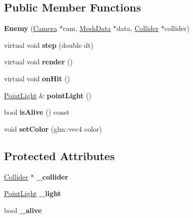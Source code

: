 \subsection*{Public Member Functions}
\begin{DoxyCompactItemize}
\item 
\hypertarget{class_enemy_a510bb7f4bb1a38fefaef246c458e672a}{}{\bfseries Enemy} (\hyperlink{class_camera}{Camera} $\ast$cam, \hyperlink{class_mesh_data}{Mesh\+Data} $\ast$data, \hyperlink{class_collider}{Collider} $\ast$collider)\label{class_enemy_a510bb7f4bb1a38fefaef246c458e672a}

\item 
\hypertarget{class_enemy_ae741a4a1ba7097e42b6764923e82b8fc}{}virtual void {\bfseries step} (double dt)\label{class_enemy_ae741a4a1ba7097e42b6764923e82b8fc}

\item 
\hypertarget{class_enemy_a62875c8aba22d278c89caa87af6c7b69}{}virtual void {\bfseries render} ()\label{class_enemy_a62875c8aba22d278c89caa87af6c7b69}

\item 
\hypertarget{class_enemy_a116b78399fc93edf91ae2b20cb278a26}{}virtual void {\bfseries on\+Hit} ()\label{class_enemy_a116b78399fc93edf91ae2b20cb278a26}

\item 
\hypertarget{class_enemy_a2faed0e6daf8ca132f40c33e7b192a07}{}\hyperlink{class_point_light}{Point\+Light} \& {\bfseries point\+Light} ()\label{class_enemy_a2faed0e6daf8ca132f40c33e7b192a07}

\item 
\hypertarget{class_enemy_a0f2ab608b481d1f19f65e83f98eda591}{}bool {\bfseries is\+Alive} () const \label{class_enemy_a0f2ab608b481d1f19f65e83f98eda591}

\item 
\hypertarget{class_enemy_a01f4404cf0c0c38bb287241541c2cef1}{}void {\bfseries set\+Color} (glm\+::vec4 color)\label{class_enemy_a01f4404cf0c0c38bb287241541c2cef1}

\end{DoxyCompactItemize}
\subsection*{Protected Attributes}
\begin{DoxyCompactItemize}
\item 
\hypertarget{class_enemy_ab90b6580f551c2d344dcdd9848d3da0a}{}\hyperlink{class_collider}{Collider} $\ast$ {\bfseries \+\_\+collider}\label{class_enemy_ab90b6580f551c2d344dcdd9848d3da0a}

\item 
\hypertarget{class_enemy_a7bb871e6546c740a456613873f472e69}{}\hyperlink{class_point_light}{Point\+Light} {\bfseries \+\_\+light}\label{class_enemy_a7bb871e6546c740a456613873f472e69}

\item 
\hypertarget{class_enemy_acf28445e8f8aabedcc8cd248ca1b9588}{}bool {\bfseries \+\_\+alive}\label{class_enemy_acf28445e8f8aabedcc8cd248ca1b9588}

\end{DoxyCompactItemize}
